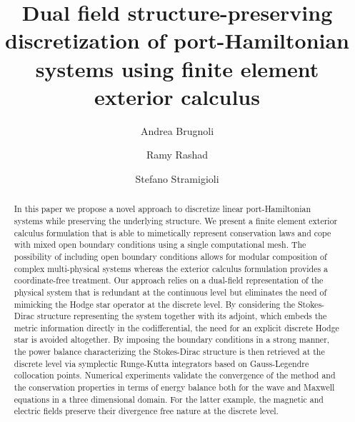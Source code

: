 \documentclass{elsarticle}
\begin{document}
\begin{frontmatter}	
		
		\title{Dual field structure-preserving discretization of port-Hamiltonian systems using finite element exterior calculus}	
		\author[UT]{Andrea Brugnoli}
		
	    \author[UT]{Ramy Rashad}
        \author[UT]{Stefano Stramigioli}

	    \address[UT]{Robotics and Mechatronics Department, University of Twente, The Netherlands}

		\begin{abstract}
	
	In this paper we propose a novel approach to discretize linear port-Hamiltonian systems while preserving the underlying structure. We present a finite element exterior calculus formulation that is able to mimetically represent conservation laws and cope with mixed open boundary conditions using a single computational mesh.
	The possibility of including open boundary conditions allows for modular composition of complex multi-physical systems whereas the exterior calculus formulation provides a coordinate-free treatment.
	Our approach relies on a dual-field representation of the physical system that is redundant at the continuous level but eliminates the need of mimicking the Hodge star operator at the discrete level.
	By considering the Stokes-Dirac structure representing the system together with its adjoint, which  embeds the metric information directly in the codifferential, the need for an explicit discrete Hodge star is avoided altogether.
	By imposing the boundary conditions in a strong manner, the power balance characterizing the Stokes-Dirac structure is then retrieved at the discrete level via symplectic Runge-Kutta integrators based on Gauss-Legendre collocation points. Numerical experiments validate the convergence of the method and the conservation properties in terms of energy balance both  for the wave and Maxwell equations in a three dimensional domain. For the latter example, the magnetic and electric fields preserve their divergence free nature at the discrete level.


\end{abstract}
\end{frontmatter}
\end{document}
